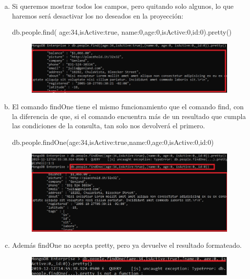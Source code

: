 \documentclass[preprint,12pt]{elsarticle}
\begin{document}
\begin{enumerate}[a)]
\item Si queremos mostrar todos los campos, pero quitando solo algunos, lo que haremos será desactivar los no deseados en la proyección:

db.people.find(\newline
{age:34,isActive:true},\newline
{name:0,age:0,isActive:0,id:0}).pretty()\newline

\begin{figure}[htb]
	\begin{center}
		\includegraphics[width=13cm]{./IMAGENES/Mongo014}
	\end{center}
\end{figure}

\item El comando findOne tiene el mismo funcionamiento que el comando find, con la diferencia de que, si el comando encuentra más de un resultado que cumpla las condiciones de la consulta, tan solo nos devolverá el primero.

db.people.findOne({age:34,isActive:true},{name:0,age:0,isActive:0,id:0})

\begin{figure}[htb]
	\begin{center}
		\includegraphics[width=13cm]{./IMAGENES/Mongo015}
	\end{center}
\end{figure}

\item Además findOne no acepta pretty, pero ya devuelve el resultado formateado.

\begin{figure}[htb]
	\begin{center}
		\includegraphics[width=13cm]{./IMAGENES/Mongo016}
	\end{center}
\end{figure}


\end{enumerate}
\end{document}
